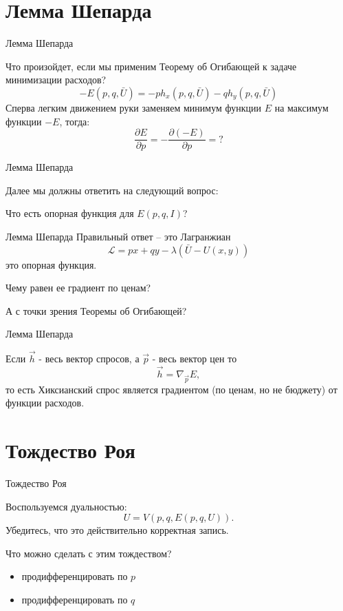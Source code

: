 \documentclass{beamer}
\begin{document}
\section{Лемма Шепарда}

\begin{frame}{Лемма Шепарда}

Что произойдет, если мы применим Теорему об Огибающей к задаче минимизации расходов?
$$ -E(p,q,\bar U) = - p h_x(p,q,\bar U) - q h_y(p,q,\bar U)$$
Сперва легким движением руки заменяем минимум функции $E$ на максимум функции $-E$, тогда:
$$\frac{\partial E}{\partial p} = -\frac{\partial(-E)}{\partial p} = ?$$
\end{frame}

\begin{frame}{Лемма Шепарда}

Далее мы должны ответить на следующий вопрос:

Что есть опорная функция для $E(p,q,I)$?
\end{frame}

\begin{frame}{Лемма Шепарда}
Правильный ответ – это Лагранжиан 
$$\mathcal{L}=px + qy - \lambda(\bar U - U(x,y))$$
это опорная функция. 

Чему равен ее градиент \alert{по ценам}?

А с точки зрения Теоремы об Огибающей?
\end{frame}

\begin{frame}{Лемма Шепарда}
\begin{theorem}
Если $\vec{h}$ - весь вектор спросов, а $\vec{p}$ - весь вектор цен то
$$\vec{h} = \nabla_{\vec{p}} E,$$
то есть Хиксианский спрос является градиентом (по ценам, но не бюджету) от функции расходов.
\end{theorem}

\end{frame}

\section{Тождество Роя}

\begin{frame}{Тождество Роя}

Воспользуемся дуальностью:
$$U = V(p, q, E(p,q,U)).$$
Убедитесь, что это действительно корректная запись.

Что можно сделать с этим тождеством?
\begin{itemize}
\item продифференцировать по $p$
\item продифференцировать по $q$
\end{itemize}

\end{frame}
\end{document}

